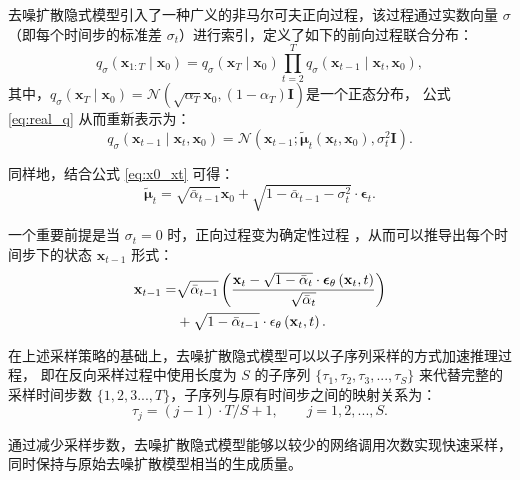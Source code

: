 去噪扩散隐式模型引入了一种广义的非马尔可夫正向过程，该过程通过实数向量 $\sigma$ （即每个时间步的标准差 $\sigma_t$）进行索引，定义了如下的前向过程联合分布：
\begin{equation}
    q_\sigma\left(\mathbf{x}_{1: T} \mid \mathbf{x}_0\right)=q_\sigma\left(\mathbf{x}_T \mid \mathbf{x}_0\right) \prod_{t=2}^T q_\sigma\left(\mathbf{x}_{t-1} \mid \mathbf{x}_t, \mathbf{x}_0\right),
\end{equation}
其中，$q_\sigma\left(\boldsymbol{x}_T \mid \boldsymbol{x}_0\right)=\mathcal{N}\left(\sqrt{\alpha_T} \boldsymbol{x}_0,\left(1-\alpha_T\right) \boldsymbol{I}\right)$是一个正态分布， 公式 \eqref{eq:real_q} 从而重新表示为：
\begin{equation}
    q_\sigma\left(\mathbf{x}_{t-1} \mid \mathbf{x}_t, \mathbf{x}_0\right)=\mathcal{N}\left(\mathbf{x}_{t-1} ; \tilde{\boldsymbol{\mu}}_t\left(\mathbf{x}_t, \mathbf{x}_0\right), \sigma_t^2 \mathbf{I}\right).
\end{equation}

同样地，结合公式 \eqref{eq:x0_xt} 可得：
\begin{equation}
    \tilde{\boldsymbol{\mu}}_t=\sqrt{\bar{\alpha}_{t-1}} \mathbf{x}_0+\sqrt{1-\bar{\alpha}_{t-1}-\sigma_t^2} \cdot \boldsymbol{\epsilon}_t.
\end{equation}

一个重要前提是当 $\sigma_t=0$ 时，正向过程变为确定性过程 \cite{ddim}，从而可以推导出每个时间步下的状态 $\mathbf{x}_{t-1}$ 形式：
\begin{align}
     \mathbf{x}_{t-1} =& \sqrt{\bar{\alpha}_{t-1}}\left(\frac{\mathbf{x}_t-\sqrt{1-\bar{\alpha}_t} \cdot \boldsymbol{\epsilon}_\theta\left(\mathbf{x}_t, t\right)}{\sqrt{\bar{\alpha}_t}}\right) \notag \\
     &+ \sqrt{1-\bar{\alpha}_{t-1}} \cdot \epsilon_\theta\left(\mathbf{x}_t, t\right).
\end{align}

在上述采样策略的基础上，去噪扩散隐式模型可以以子序列采样的方式加速推理过程，
即在反向采样过程中使用长度为 $S$ 的子序列 $\{\tau_1, \tau_2, \tau_3, ..., \tau_S\}$ 来代替完整的采样时间步数 $\{1,2,3..., T\}$，子序列与原有时间步之间的映射关系为：
\begin{equation}
    \tau_j=(j-1) \cdot T / S+1,  \quad\quad j=1,2,...,S .
\end{equation}

通过减少采样步数，去噪扩散隐式模型能够以较少的网络调用次数实现快速采样，同时保持与原始去噪扩散模型相当的生成质量。



